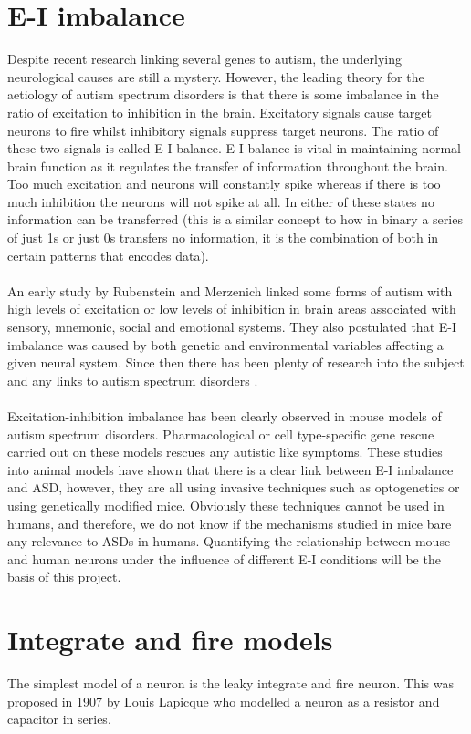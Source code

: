 \documentclass{epsrc}
\begin{document}
\section{E-I imbalance}
\noindent
Despite recent research linking several genes to autism, the underlying neurological causes are still a mystery. However, the leading theory for the aetiology of autism spectrum disorders is that there is some imbalance in the ratio of excitation to inhibition in the brain. Excitatory signals cause target neurons to fire whilst inhibitory signals suppress target neurons. The ratio of these two signals is called E-I balance. E-I balance is vital in maintaining normal brain function as it regulates the transfer of information throughout the brain. Too much excitation and neurons will constantly spike whereas if there is too much inhibition the neurons will not spike at all. In either of these states no information can be transferred (this is a similar concept to how in binary a series of just 1s or just 0s transfers no information, it is the combination of both in certain patterns that encodes data).
\\\\
An early study by Rubenstein and Merzenich \cite{rubenstein2003model} linked some forms of autism with high levels of excitation or low levels of inhibition in brain areas associated with sensory, mnemonic, social and emotional systems. They also postulated that E-I imbalance was caused by both genetic and environmental variables affecting a given neural system. Since then there has been plenty of research into the subject and any links to autism spectrum disorders \cite{gogolla2009common, nelson2015excitatory, cellot2014gabaergic}.
\\\\
Excitation-inhibition imbalance has been clearly observed in mouse models of autism spectrum disorders. Pharmacological or cell type-specific gene rescue carried out on these models rescues any autistic like symptoms. These studies into animal models have shown that there is a clear link between E-I imbalance and ASD, however, they are all using invasive techniques such as optogenetics or using genetically modified mice. Obviously these techniques cannot be used in humans, and therefore, we do not know if the mechanisms studied in mice bare any relevance to ASDs in humans. Quantifying the relationship between mouse and human neurons under the influence of different E-I conditions will be the basis of this project. 
\\
\section{Integrate and fire models}
\noindent
The simplest model of a neuron is the leaky integrate and fire neuron. This was proposed in 1907 by Louis Lapicque who modelled a neuron as a resistor and capacitor in series. 
\\
\end{document}
